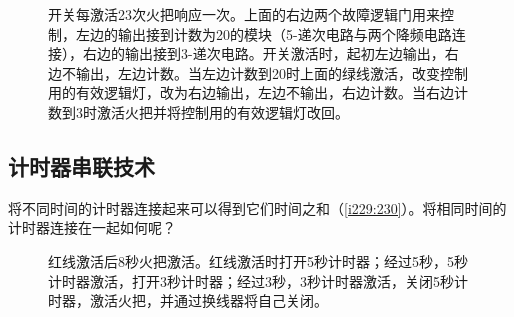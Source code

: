 \begin{figure}[!ht]
\begin{center}
\qquad
{}
\end{center}
\caption{开关每激活23次火把响应一次。上面的右边两个故障逻辑门用来控制，左边的输出接到计数为20的模块（5-递次电路与两个降频电路连接），右边的输出接到3-递次电路。开关激活时，起初左边输出，右边不输出，左边计数。当左边计数到20时上面的绿线激活，改变控制用的有效逻辑灯，改为右边输出，左边不输出，右边计数。当右边计数到3时激活火把并将控制用的有效逻辑灯改回。}
\label{i231:232}
\end{figure}

\subsection{计时器串联技术}
将不同时间的计时器连接起来可以得到它们时间之和（\autoref{i229:230}）。将相同时间的计时器连接在一起如何呢？

\begin{figure}[!ht]
\begin{center}
\qquad
{}
\end{center}
\caption{红线激活后8秒火把激活。红线激活时打开5秒计时器；经过5秒，5秒计时器激活，打开3秒计时器；经过3秒，3秒计时器激活，关闭5秒计时器，激活火把，并通过换线器将自己关闭。}
\label{i229:230}
\end{figure}

